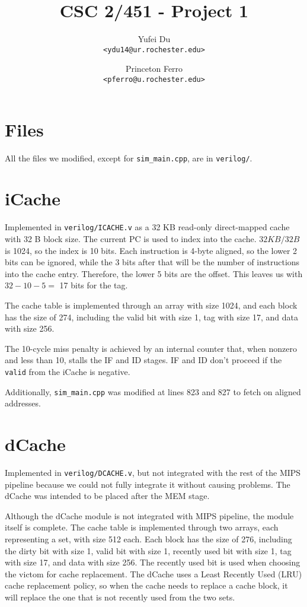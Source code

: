 \documentclass[a4paper,11pt]{article}
\title{CSC 2/451 - Project 1}
\author{
Yufei Du \\
\texttt{<ydu14@ur.rochester.edu>}
\and
Princeton Ferro \\
\texttt{<pferro@u.rochester.edu>}
}
\begin{document}
\maketitle

\section{Files}
All the files we modified, except for \texttt{sim\_main.cpp}, are in \texttt{verilog/}.

\section{iCache}
Implemented in \texttt{verilog/ICACHE.v} as a 32 KB read-only direct-mapped cache with 32 B block size. The current PC is used to index into the cache. $ 32KB / 32 B$ is 1024, so the index is 10 bits. Each instruction is 4-byte aligned, so the lower 2 bits can be ignored, while the 3 bits after that will be the number of instructions into the cache entry. Therefore, the lower 5 bits are the offset. This leaves us with $32-10-5 =$ 17 bits for the tag.

The cache table is implemented through an array with size 1024, and each block has the size of 274, including the valid bit with size 1, tag with size 17, and data with size 256. 

The 10-cycle miss penalty is achieved by an internal counter that, when nonzero and less than 10, stalls the IF and ID stages. IF and ID don't proceed if the \texttt{valid} from the iCache is negative.

Additionally, \texttt{sim\_main.cpp} was modified at lines 823 and 827 to fetch on aligned addresses.

\section{dCache}
Implemented in \texttt{verilog/DCACHE.v}, but not integrated with the rest of the MIPS pipeline because we could not fully integrate it without causing problems. The dCache was intended to be placed after the MEM stage.

Although the dCache module is not integrated with MIPS pipeline, the module itself is complete. The cache table is implemented through two arrays, each representing a set, with size 512 each. Each block has the size of 276, including the dirty bit with size 1, valid bit with size 1, recently used bit with size 1, tag with size 17, and data with size 256. The recently used bit is used when choosing the victom for cache replacement. The dCache uses a Least Recently Used (LRU) cache replacement policy, so when the cache needs to replace a cache block, it will replace the one that is not recently used from the two sets. 
\end{document}
